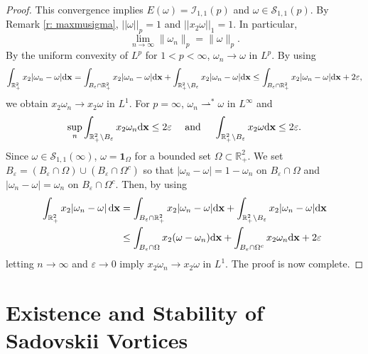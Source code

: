 \documentclass[11pt]{amsart}
\theoremstyle{definition}
\theoremstyle{definition}
\numberwithin{equation}{section}
\newcommand{\0}{\emptyset}
\newcommand{\bfx}{{\bf x}}
\newcommand{\bbR}{\mathbb R}
\newcommand{\calI}{\mathcal I}
\newcommand{\calS}{\mathcal S}
\newcommand{\varep}{\varepsilon}
\newcommand{\dd}{\mathrm{d}}
\begin{document}
\begin{proof}
				
				This convergence implies $E(\omega) = \calI_{1,1}(p)$ and $\omega\in \calS_{1,1}(p)$. By Remark \ref{r: maxmusigma}, $||\omega||_{p}=1$ and $||x_2\omega||_{1}=1$. In particular, 
				\[
				\lim_{n \to \infty} \|\omega_n\|_p = \|\omega\|_p.
				\]
				By the uniform convexity of $L^{p}$ for $1<p<\infty$, $\omega_n \to \omega$ in $L^{p}$. By using  
				\begin{align*}
					\int_{\mathbb{R}^{2}_{+}}x_2|\omega_n - \omega|  \dd \bfx  =
					\int_{B_{\varep}\cap \mathbb{R}^{2}_{+}}x_2|\omega_n - \omega|  \dd \bfx
					+ \int_{\mathbb{R}^{2}_{+}\setminus B_{\varep}}x_2|\omega_n - \omega|  \dd \bfx  \leq  \int_{B_{\varep}\cap \mathbb{R}^{2}_{+}}x_2|\omega_n - \omega|  \dd \bfx+ 2\varepsilon,
				\end{align*}
				we obtain $x_2\omega_n \to x_2\omega$ in $L^1$. For $p=\infty$, $\omega_n  \rightharpoonup^* \omega$ in $L^{\infty}$ and 
				\[
				\sup_{n}\int_{ \bbR^2_+ \setminus B_{\varep}} x_2  \omega_n   \dd \bfx  \le   2\varepsilon   \quad \mbox{ and } \quad			\int_{ \bbR^2_+ \setminus B_{\varep}} x_2  \omega   \dd \bfx  \le   2\varepsilon.
				\]
				Since $\omega\in \calS_{1,1}({\infty})$, $\omega = \mathbf{1}_{\Omega}$ for a bounded set $\Omega\subset \mathbb{R}^{2}_{+}$. We set $B_{\varepsilon}=(B_{\varepsilon}\cap \Omega) \cup (B_{\varepsilon}\cap \Omega^{c})$ so that $|\omega_n-\omega|=1-\omega_n$ on $B_{\varepsilon}\cap \Omega$ and $|\omega_n-\omega|=\omega_n$ on $B_{\varepsilon}\cap \Omega^{c}$. Then, by using 
				\begin{equation*}
					\label{eq_conv_impulse}
					\begin{aligned}
						\int_{\bbR^2_+} x_2 |\omega_n - \omega| \, \dd\bfx &= \int_{B_{\varep}\cap \mathbb{R}^{2}_{+}}x_2|\omega_n - \omega|  \dd \bfx
						+ \int_{\mathbb{R}^{2}_{+}\setminus B_{\varep}}x_2|\omega_n-\omega|  \dd \bfx \\
						& \le \int_{B_{\varep}\cap \Omega }x_2 (\omega - \omega_n)  \dd \bfx + \int_{B_{\varep}\cap \Omega^c} x_2 \omega_n   \dd \bfx + 2\varepsilon
					\end{aligned}
				\end{equation*}
				letting $n\to\infty$ and $\varepsilon\to 0$ imply $x_2\omega_n \to x_2 \omega$ in $L^1$. The proof is now complete.
			\end{proof}    
			
			
			\section{Existence and Stability of Sadovskii Vortices}
			\label{sec:main}
			
\end{document}
